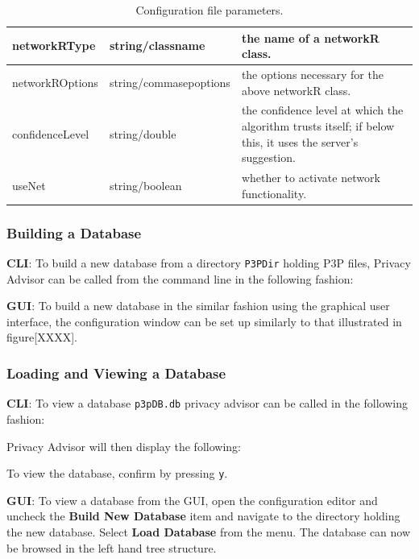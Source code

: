 \begin{center}
\begin{table}[h!]
\begin{tabular} { | l | l | p{7cm} | }
      networkRType & string/classname & the name of a networkR class. \\ \hline
      networkROptions & string/commasepoptions	& the options necessary for the above networkR class. \\ \hline
      confidenceLevel & string/double & the confidence level at which the algorithm trusts itself; if below this, it uses the server's suggestion. \\ \hline
      useNet & string/boolean & whether to activate network functionality. \\ \hline
      \hline
    \end{tabular}
    \caption{Configuration file parameters.}
  \end{table}
\end{center}

\subsubsection{Building a Database}

\textbf{CLI}: To build a new database from a directory \texttt{P3PDir} holding P3P files, Privacy
Advisor can be called from the command line in the following fashion:


\textbf{GUI}: To build a new database in the similar fashion using the
graphical user interface, the configuration window can be set up
similarly to that illustrated in figure[XXXX].

\subsubsection{Loading and Viewing a Database}

\textbf{CLI}: To view a database \texttt{p3pDB.db} privacy advisor can be called in the following fashion:


Privacy Advisor will then display the following:


To view the database, confirm by pressing \texttt{y}.

\textbf{GUI}: To view a database from the GUI, open the configuration editor and uncheck the \textbf{Build New Database} item and 
navigate to the directory holding the new database. Select \textbf{Load Database} from the menu. The database can now be browsed in
the left hand tree structure.


